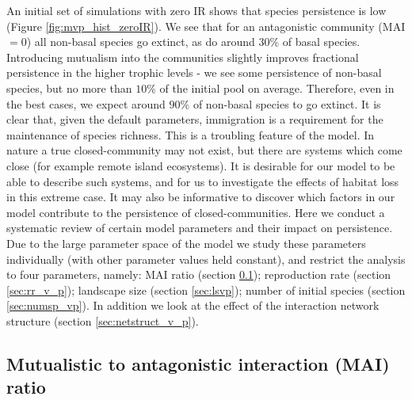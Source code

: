 An initial set of simulations with zero IR shows that species persistence is low (Figure \ref{fig:mvp_hist_zeroIR}). We see that for an antagonistic community (MAI$=0$) all non-basal species go extinct, as do around $30\%$ of basal species. Introducing mutualism into the communities slightly improves fractional persistence in the higher trophic levels - we see some persistence of non-basal species, but no more than $10\%$ of the initial pool on average. Therefore, even in the best cases, we expect around $90\%$ of non-basal species to go extinct. It is clear that, given the default parameters, immigration is a requirement for the maintenance of species richness. This is a troubling feature of the model. In nature a true closed-community may not exist, but there are systems which come close (for example remote island ecosystems). It is desirable for our model to be able to describe such systems, and for us to investigate the effects of habitat loss in this extreme case.  It may also be informative to discover which factors in our model contribute to the persistence of closed-communities. Here we conduct a systematic review of certain model parameters and their impact on persistence. Due to the large parameter space of the model we study these parameters individually (with other parameter values held constant), and restrict the analysis to four parameters, namely: MAI ratio (section \ref{sec:mvp}); reproduction rate (section \ref{sec:rr_v_p}); landscape size (section \ref{sec:lsvp}); number of initial species (section \ref{sec:numsp_vp}). In addition we look at the effect of the interaction network structure (section \ref{sec:netstruct_v_p}).



\subsection{Mutualistic to antagonistic interaction (MAI) ratio}
\label{sec:mvp}


